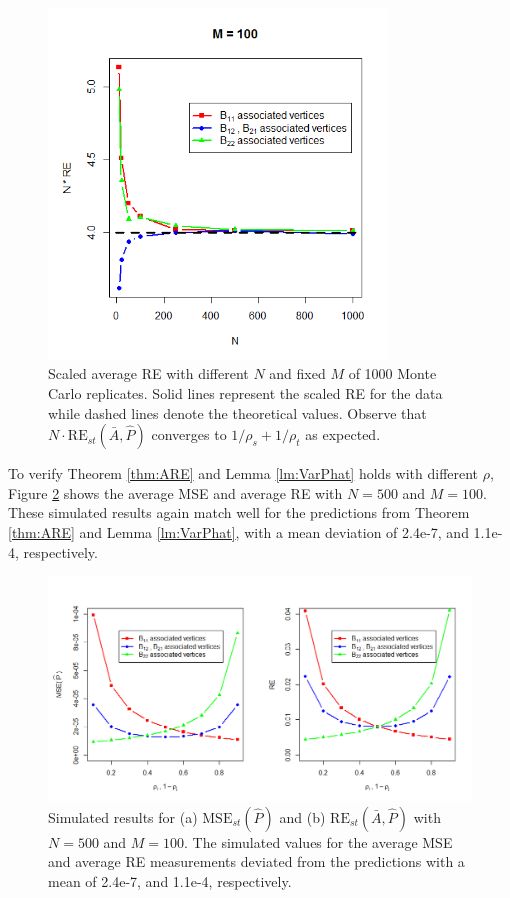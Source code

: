 \begin{figure}[!htb]
	\centering
	\includegraphics[width=9cm]{RE.PNG}
	\caption{Scaled average RE with different $N$ and fixed $M$ of 1000 Monte Carlo replicates. Solid lines represent the scaled RE for the data while dashed lines denote the theoretical values. Observe that $N \cdot \mathrm{RE}_{st}(\bar{A}, \hat{P})$ converges to $1/\rho_s + 1/\rho_t$ as expected.}
	\label{fig:RE}
\end{figure}




To verify Theorem \ref{thm:ARE} and Lemma \ref{lm:VarPhat} holds with different $\rho$, Figure \ref{fig:RErho} shows the average MSE and average RE with $N = 500$ and $M = 100$. These simulated results again match well for the predictions from Theorem \ref{thm:ARE} and Lemma \ref{lm:VarPhat}, with a mean deviation of 2.4e-7, and 1.1e-4, respectively.
\begin{figure}[!htb]
	\centering
	\includegraphics[width=14cm]{VarRE.PNG}
	\caption{Simulated results for (a) $\mathrm{MSE}_{st}(\hat{P})$ and (b) $\mathrm{RE}_{st}(\bar{A}, \hat{P})$ with $N = 500$ and $M = 100$. The simulated values for the average MSE and average RE measurements deviated from the predictions with a mean of 2.4e-7, and 1.1e-4, respectively.}
	\label{fig:RErho}
\end{figure}





